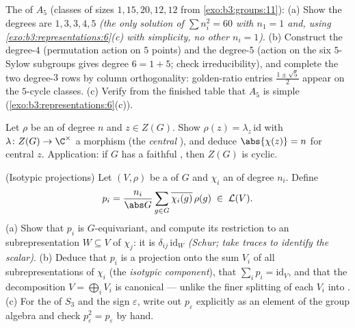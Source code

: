 \begin{exercise}[$\star\star\star$]\label{exo:b3:representations:9}
The  of $A_5$ (classes of sizes $1, 15, 20, 12,
12$ from \cref{exo:b3:groups:11}):
(a) Show the degrees are $1, 3, 3, 4, 5$ \emph{(the only
solution of $\sum n_i^2 = 60$ with $n_1 = 1$ and, using
\cref{exo:b3:representations:6}(c) with simplicity, no other
$n_i = 1$)}.
(b) Construct the degree-$4$  (permutation action on
$5$ points) and the degree-$5$  (action on the six
$5$-Sylow subgroups gives degree $6 = 1 + 5$; check
irreducibility), and complete the two degree-$3$ rows by column
orthogonality: golden-ratio entries $\frac{1\pm\sqrt5}2$ appear
on the $5$-cycle classes.
(c) Verify from the finished table that $A_5$ is simple
(\cref{exo:b3:representations:6}(c)).
\end{exercise}

\begin{exercise}[$\star\star$]\label{exo:b3:representations:10}
Let $\rho$ be an  of degree $n$ and $z
\in Z(G)$. Show $\rho(z) = \lambda_z\,\mathrm{id}$ with
$\lambda \colon Z(G) \to \C^\times$ a morphism (the
\emph{central }), and deduce $\abs{\chi(z)} = n$ for
central $z$. Application: if $G$ has a faithful , then $Z(G)$ is cyclic.
\end{exercise}

\begin{exercise}[$\star\star$]\label{exo:b3:representations:11}
(Isotypic projections) Let $(V, \rho)$ be a  of
$G$ and $\chi_i$ an   of degree $n_i$.
Define
\[
p_i = \frac{n_i}{\abs G}\sum_{g\in G}
\overline{\chi_i(g)}\,\rho(g) \;\in\; \mathcal L(V).
\]
(a) Show that $p_i$ is $G$-equivariant, and compute its
restriction to an  subrepresentation $W \subseteq
V$ of  $\chi_j$: it is $\delta_{ij}\,
\mathrm{id}_W$ \emph{(Schur; take traces to identify the
scalar)}.
(b) Deduce that $p_i$ is a projection onto the sum $V_i$ of
all  subrepresentations of  $\chi_i$ (the
\emph{isotypic component}), that $\sum_ip_i =
\mathrm{id}_V$, and that the decomposition $V =
\bigoplus_iV_i$ is canonical --- unlike the finer splitting
of each $V_i$ into .
(c) For the  of $S_3$ and the sign
 $\varepsilon$, write out $p_\varepsilon$ explicitly
as an element of the group algebra and check $p_\varepsilon^2
= p_\varepsilon$ by hand.
\end{exercise}

